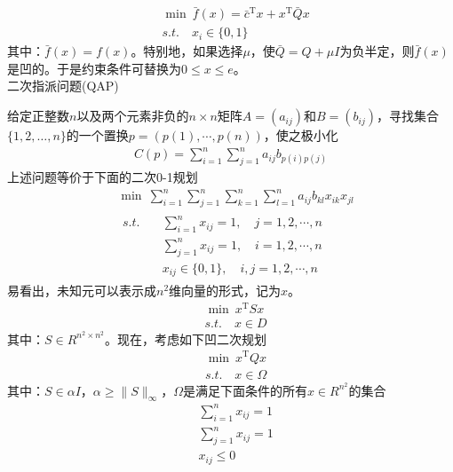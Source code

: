         \begin{align*}
       & \mathop {\min}\ \bar{f}(x)={\bar{c}}^\mathrm{T} x+  x^\mathrm{T} {\bar{Q}}x\\
       & s.t.\quad x_i\in \{0,1\}
        \end{align*}
        其中：$\bar{f}(x)=f(x)$。特别地，如果选择$\mu$，使${\bar{Q}}=Q+\mu I$为负半定，则$\bar{f}(x)$是凹的。于是约束条件可替换为$0\leqslant x \leqslant e$。\\
        二次指派问题(QAP)
        \par
        给定正整数$n$以及两个元素非负的$n \times n$矩阵$A=(a_{ij})$和$B=(b_{ij})$，寻找集合$\{1,2,\ldots,n\}$的一个置换$p=\left(p(1),\cdots,p(n)\right)$，使之极小化
        \begin{align*}
       C(p)=\mathop{\sum}\limits_{i=1}^n\mathop{\sum}\limits_{j=1}^na_{ij}b_{p(i)p(j)}
        \end{align*}
        上述问题等价于下面的二次0-1规划
        \begin{align*}
       &{\min}\  \mathop{\sum}\limits_{i=1}^n\mathop{\sum}\limits_{j=1}^n\mathop{\sum}\limits_{k=1}^n\mathop{\sum}\limits_{l=1}^na_{ij}b_{kl}x_{ik}x_{jl}\\
       &\begin{aligned}
       s.t.\quad &\mathop{\sum}\limits_{i=1}^nx_{ij}=1,\quad j=1,2,\cdots,n\\
        &\mathop{\sum}\limits_{j=1}^nx_{ij}=1,\quad i=1,2,\cdots,n\\
        &x_{ij}\in\{0,1\},\quad i,j=1,2,\cdots,n
       \end{aligned}
        \end{align*}
        易看出，未知元可以表示成$n^2$维向量的形式，记为$x$。
        \begin{align*}
       &\mathop {\min}\   x^\mathrm{T} Sx\\
       &s.t.\quad x \in D
        \end{align*}
        其中：$S\in R^{n^2\times n^2}$。现在，考虑如下凹二次规划
        \begin{align*}
       &\mathop {\min}\   x^\mathrm{T} Qx\\
       &s.t.\quad x \in \Omega
        \end{align*}
        其中：$S\in \alpha I$，$\alpha \geqslant \|S\|_{\infty}$，$\Omega$是满足下面条件的所有$x \in R^{n^2}$的集合
        \begin{align*}
       & \mathop{\sum}\limits_{i=1}^nx_{ij}=1\\
       & \mathop{\sum}\limits_{j=1}^nx_{ij}=1\\
       & x_{ij}\leqslant 0
        \end{align*}
